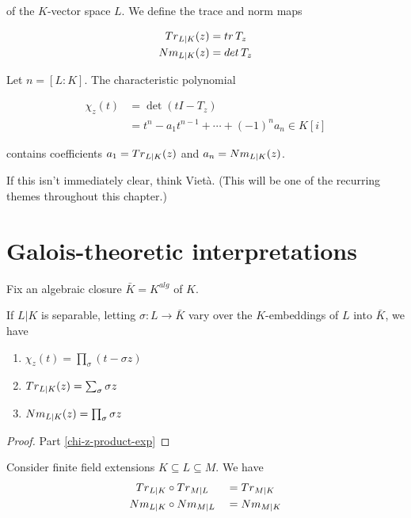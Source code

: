 \documentclass{memoir}
\begin{document}
of the $K$-vector space $L$. We define the trace and norm maps

\noindent
\begin{align*}
  {\mathnormal{Tr}}_{L|K}(z) &= \operatorname{{\mathnormal{tr}}} T_z\\
  {\mathnormal{Nm}}_{L|K}(z) &= \operatorname{{\mathnormal{det}}} T_z
\end{align*}

Let $n = [L : K]$. The characteristic polynomial

\noindent
\begin{align*}
  \chi_z(t) &= \det (tI - T_z)\\
            &= t^n - a_1t^{n-1} + \cdots + (-1)^n a_n \in K[i]
\end{align*}

contains coefficients $a_1 = {\mathnormal{Tr}}_{L|K}(z)$ and $a_n = {\mathnormal{Nm}}_{L|K}(z)$.

\begin{remark}
  If this isn't immediately clear, think Viet\`a. (This will be one of the
  recurring themes throughout this chapter.)
\end{remark}

\section{Galois-theoretic interpretations}

Fix an algebraic closure $\bar{K} = K^{alg}$ of $K$.

\begin{prop}
  If $L|K$ is separable, letting $\sigma : L \to \bar{K}$ vary over the
  $K$-embeddings of $L$ into $\bar{K}$, we have
  \begin{enumerate}
  \item \label{chi-z-product-exp} $\chi_z(t) = \prod_\sigma (t - \sigma z)$
  \item ${\mathnormal{Tr}}_{L|K}(z) = \sum_\sigma \sigma z$
  \item ${\mathnormal{Nm}}_{L|K}(z) = \prod_\sigma \sigma z$
  \end{enumerate}
\end{prop}

\begin{proof}
  Part \ref{chi-z-product-exp}
\end{proof}

\begin{theorem}{\label{mul-trace-norm}}
  Consider finite field extensions $K \subseteq L \subseteq M$. We have
  \begin{alignat*}{2}
    {\mathnormal{Tr}}_{L|K} &\circ {\mathnormal{Tr}}_{M|L} &&= {\mathnormal{Tr}}_{M|K}\\
    {\mathnormal{Nm}}_{L|K} &\circ {\mathnormal{Nm}}_{M|L} &&= {\mathnormal{Nm}}_{M|K}
  \end{alignat*}
\end{theorem}
\end{document}
